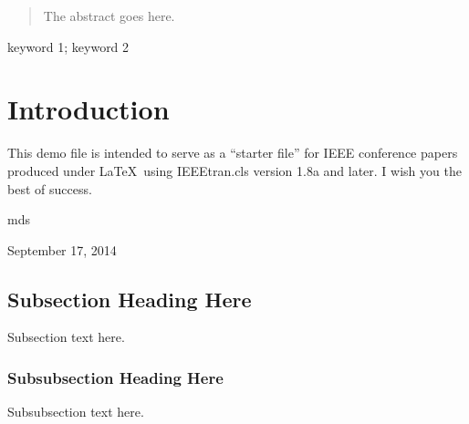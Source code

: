 \documentclass[conference]{IEEEtran}
\begin{document}




\maketitle

\begin{abstract}
The abstract goes here.
\end{abstract}

\begin{IEEEkeywords}
keyword 1; keyword 2
\end{IEEEkeywords}


%
\IEEEpeerreviewmaketitle



\section{Introduction}
This demo file is intended to serve as a ``starter file''
for IEEE conference papers produced under \LaTeX\ using
IEEEtran.cls version 1.8a and later.
I wish you the best of success.

\hfill mds

\hfill September 17, 2014


\subsection{Subsection Heading Here}
Subsection text here.


\subsubsection{Subsubsection Heading Here}
Subsubsection text here.
\end{document}
